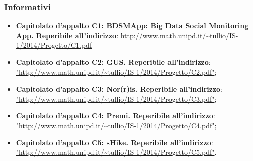 		\subsubsection{Informativi}
		\begin{itemize}
			\item \textbf{Capitolato d’appalto C1: BDSMApp: Big Data Social Monitoring App. Reperibile all'indirizzo}:  \url{http://www.math.unipd.it/~tullio/IS-1/2014/Progetto/C1.pdf}
			\item \textbf{Capitolato d’appalto C2: GUS. Reperibile all'indirizzo}: \url{"http://www.math.unipd.it/~tullio/IS-1/2014/Progetto/C2.pdf"};
			\item \textbf{Capitolato d’appalto C3: Nor(r)is. Reperibile all'indirizzo}: \url{"http://www.math.unipd.it/~tullio/IS-1/2014/Progetto/C3.pdf"};
			\item \textbf{Capitolato d’appalto C4: Premi. Reperibile all'indirizzo}: \url{"http://www.math.unipd.it/~tullio/IS-1/2014/Progetto/C4.pdf"};
			\item \textbf{Capitolato d’appalto C5: sHike. Reperibile all'indirizzo}: \url{"http://www.math.unipd.it/~tullio/IS-1/2014/Progetto/C5.pdf"}.
		\end{itemize}
